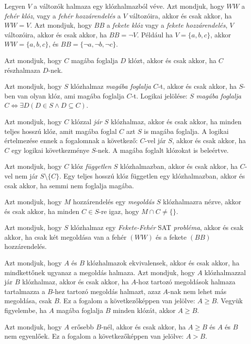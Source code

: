 \documentclass[
]{thesis-ekf}
\theoremstyle{definition}
\theoremstyle{remark}
\begin{document}
	Legyen $ V $ a változók halmaza egy klózhalmazból véve. Azt mondjuk, hogy $ WW $ a \emph{fehér klóz}, vagy a \emph{fehér hozzárendelés} a $ V $ változóira, akkor és csak akkor, ha $ WW=V $. Azt mondjuk, hogy $ BB $ a \emph{fekete klóz} vagy a \emph{fekete hozzárendelés}, $ V $ változóira, akkor és csak akkor, ha $ BB =\neg V$. Például ha $ V=\{a,b,c\} $, akkor $ WW=\{a,b,c\} $, és $ BB=\{\neg a,\neg b,\neg c\} $.
	
	Azt mondjuk, hogy $ C $ magába foglalja $ D $ klózt, akkor és csak akkor, ha $ C $ részhalmaza $ D $-nek.
	
	Azt mondjuk, hogy $ S $ klózhalmaz \emph{magába foglalja} $ C $-t, akkor és csak akkor, ha $ S $-ben van olyan klóz, ami magába foglalja $ C $-t. Logikai jelölése: $ S $ \emph{magába foglalja} $ C \Leftrightarrow\exists D(D\in S\wedge D\subseteq C) $.
	
	Azt mondjuk, hogy $ C $ klózzal \emph{jár} $ S $ klózhalmaz, akkor és csak akkor, ha minden teljes hosszú klóz, amit magába foglal $ C $ azt $ S $ is magába foglalja. A logikai értelmezése ennek a fogalomnak a következő: $ C $-vel jár $ S $, akkor és csak akkor, ha $ C $ egy logikai következménye $ S $-nek. A magába foglalt klózokat is beleértve.

	Azt mondjuk, hogy $ C $ klóz \emph{független} $ S $ klózhalmazban, akkor és csak akkor, ha $ C $-vel nem jár $ S\setminus\{C\} $. Egy teljes hosszú klóz független egy klózhalmazban, akkor és csak akkor, ha semmi nem foglalja magába.

	Azt mondjuk, hogy $ M $ hozzárendelés egy \emph{megoldás} $ S $ klózhalmazra nézve, akkor és csak akkor, ha minden $ C\in S $-re igaz, hogy $ M\cap C\ne \{\} $.

	Azt mondjuk, hogy $ S $ klózhalmaz egy \emph{Fekete-Fehér} \textsc{SAT} \emph{probléma}, akkor és csak akkor, ha csak két megoldása van a fehér $ (WW) $ és a fekete $ (BB) $ hozzárendelés.

	Azt mondjuk, hogy $ A $ és $ B $ klózhalmazok ekvivalensek, akkor és csak akkor, ha mindkettőnek ugyanaz a megoldás halmaza. Azt mondjuk, hogy $ A $ klózhalmazzal jár $ B $ klózhalmaz, akkor és csak akkor, ha $ A $-hoz tartozó megoldások halmaza tartalmazza a $ B $-hez tartozó megoldás halmazt, azaz $ A $-nak nem lehet más megoldása, csak $ B $. Ez a fogalom a következőképpen van jelölve: $ A\geq B $. Vegyük figyelembe, ha $ A $ magába foglalja $ B $ minden klózát, akkor $ A\geq B $.

	Azt mondjuk, hogy $ A $ erősebb $ B $-nél, akkor és csak akkor, ha $ A\geq B $ és $ A $ és $ B $ nem egyenlőek. Ez a fogalom a következőképpen van jelölve: $ A>B $.
\end{document}

